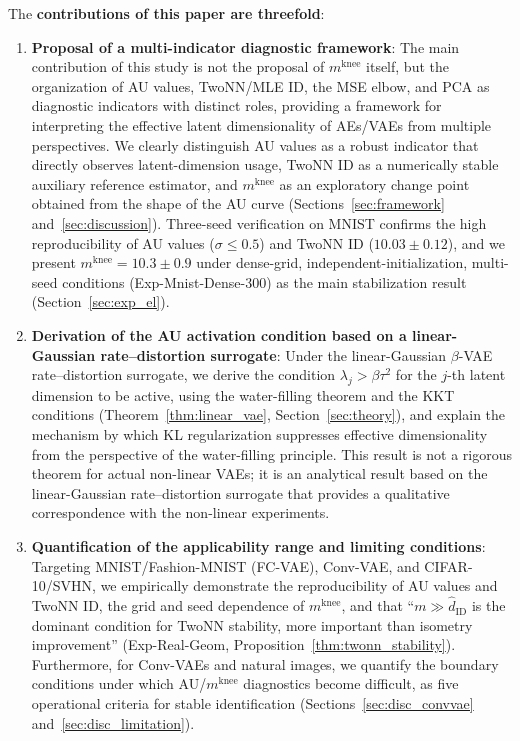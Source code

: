 \documentclass[make,article,submit,pdftex,moreauthors]{Definitions/mdpi}
\newcommand{\mknee}{m^{\mathrm{knee}}}
\begin{document}
The \textbf{contributions of this paper are threefold}:
\begin{enumerate}
  \item \textbf{Proposal of a multi-indicator diagnostic framework}:
        The main contribution of this study is not the proposal of $\mknee$ itself,
        but the organization of AU values, TwoNN/MLE ID, the MSE elbow, and PCA as
        diagnostic indicators with distinct roles, providing a framework for
        interpreting the effective latent dimensionality of AEs/VAEs from multiple
        perspectives.
        We clearly distinguish AU values as a robust indicator that directly
        observes latent-dimension usage,
        TwoNN ID as a numerically stable auxiliary reference estimator, and
        $\mknee$ as an exploratory change point obtained from the shape of the AU curve
        (Sections~\ref{sec:framework} and~\ref{sec:discussion}).
        Three-seed verification on MNIST confirms the high reproducibility of
        AU values ($\sigma \leq 0.5$) and TwoNN ID ($10.03 \pm 0.12$), and we
        present $\mknee = 10.3 \pm 0.9$ under dense-grid, independent-initialization,
        multi-seed conditions (Exp-Mnist-Dense-300) as the main stabilization result
        (Section~\ref{sec:exp_el}).
  \item \textbf{Derivation of the AU activation condition based on a linear-Gaussian
        rate--distortion surrogate}:
        Under the linear-Gaussian $\beta$-VAE rate--distortion surrogate, we derive
        the condition $\lambda_j > \beta\tau^2$ for the $j$-th latent dimension to be
        active, using the water-filling theorem and the KKT conditions
        (Theorem~\ref{thm:linear_vae}, Section~\ref{sec:theory}), and explain the
        mechanism by which KL regularization suppresses effective dimensionality
        from the perspective of the water-filling principle.
        This result is not a rigorous theorem for actual non-linear VAEs; it is an
        analytical result based on the linear-Gaussian rate--distortion surrogate
        that provides a qualitative correspondence with the non-linear experiments.
  \item \textbf{Quantification of the applicability range and limiting conditions}:
        Targeting MNIST/Fashion-MNIST (FC-VAE), Conv-VAE, and CIFAR-10/SVHN, we
        empirically demonstrate the reproducibility of AU values and TwoNN ID,
        the grid and seed dependence of $\mknee$, and that
        ``$m \gg \hat{d}_\mathrm{ID}$ is the dominant condition for TwoNN stability,
        more important than isometry improvement''
        (Exp-Real-Geom, Proposition~\ref{thm:twonn_stability}).
        Furthermore, for Conv-VAEs and natural images, we quantify the boundary
        conditions under which AU/$\mknee$ diagnostics become difficult, as five
        operational criteria for stable identification
        (Sections~\ref{sec:disc_convvae} and~\ref{sec:disc_limitation}).
\end{enumerate}
\end{document}
